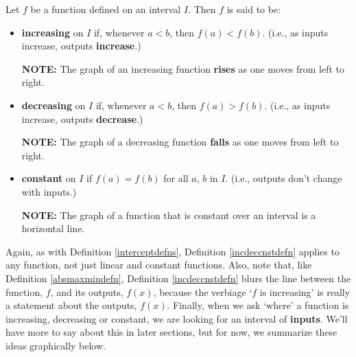 \documentclass{ximera}
\begin{document}
\begin{definition}

\label{incdeccnstdefn}

Let $f$ be a function defined on an interval $I$.  Then $f$ is said to be:

\begin{itemize}

\item  \textbf{increasing} on $I$ if, whenever $a < b$, then $f(a) < f(b)$.   (i.e., as inputs increase, outputs \textbf{increase}.)

\textbf{NOTE:}  The graph of an increasing function  \textbf{rises} as one moves from left to right.

\item  \textbf{decreasing} on $I$ if, whenever $a < b$, then $f(a) > f(b)$.  (i.e., as inputs increase, outputs \textbf{decrease}.)

\textbf{NOTE:}  The graph of a decreasing function \textbf{falls} as one moves from left to right.

\item  \textbf{constant} on $I$ if $f(a) = f(b)$ for all $a$, $b$ in $I$.  (i.e., outputs don't change with inputs.)

\textbf{NOTE:}  The graph of a function that is constant over an interval is a horizontal line.

\end{itemize}

\end{definition}




Again, as with Definition \ref{interceptdefns}, Definition  \ref{incdeccnstdefn} applies to any function, not just linear and constant functions.  Also, note that, like Definition \ref{absmaxmindefn}, Definition \ref{incdeccnstdefn}  blurs the line between the function, $f$, and its outputs, $f(x)$, because the verbiage `$f$ is increasing' is really a statement about the outputs, $f(x)$.  Finally, when we ask `where' a function is increasing, decreasing or constant, we are looking for an interval of \textbf{inputs}.  We'll have more to say about this in later sections, but for now, we summarize these ideas graphically below.



\end{document}
